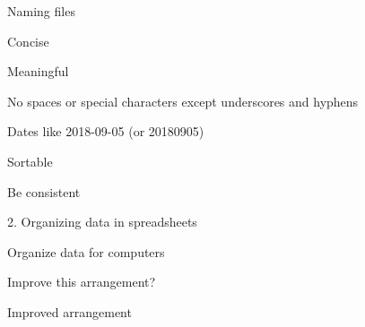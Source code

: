 \documentclass[aspectratio=169,12pt,t]{beamer}
\begin{document}
\begin{frame}[c]{Naming files}

  \bbi
\item Concise
\item Meaningful
\item No spaces or special characters except underscores and hyphens
\item Dates like 2018-09-05 (or 20180905)
\item Sortable
\item Be consistent
  \ei

\end{frame}



\begin{frame}[c]{2. Organizing data in spreadsheets}

\begin{center}
\large
Organize data for computers
\end{center}

\end{frame}


\begin{frame}[c]{Improve this arrangement?}


\end{frame}




\begin{frame}[c]{Improved arrangement}


\end{frame}
\end{document}

